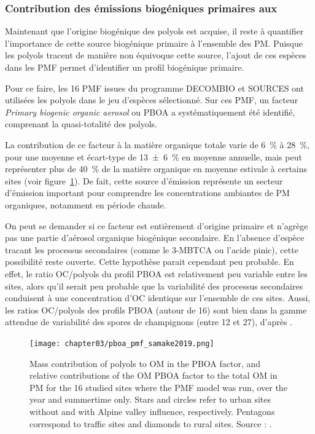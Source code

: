 \subsubsection{Contribution des émissions biogéniques primaires aux \PMdix}%
\label{ssub:contribution_des_émissions_biogéniques_primaires_aux_pmdix}

Maintenant que l'origine biogénique des polyols est acquise, il reste à quantifier
l'importance de cette source biogénique primaire à l'ensemble des PM.
Puisque les polyols tracent de manière non équivoque cette source, l'ajout de ces espèces dans
les PMF permet d'identifier un profil biogénique primaire.

Pour ce faire, les 16 PMF issues du programme DECOMBIO et SOURCES ont utilisées les polyols
dans le jeu d'espèces sélectionné. Sur ces PMF, un facteur \textit{Primary biogenic
organic aerosol} ou PBOA a systématiquement été identifié, comprenant la quasi-totalité
des polyols.

La contribution de ce facteur à la matière organique totale varie de \SI{6}{\percent} à \SI{28}{\percent}, pour une
moyenne et écart-type de \SI{13\pm6}{\percent} en moyenne annuelle, mais peut représenter
plus de \SI{40}{\percent} de la matière organique en moyenne estivale à certains sites (voir
figure~\ref{fig:chapter03/pboa_pmf_samake2019}).
De fait, cette source d'émission représente un secteur d'émission important pour comprendre
les concentrations ambiantes de PM organiques, notamment en période chaude.

On peut se demander si ce facteur est entièrement d'origine primaire et n'agrège pas une
partie d'aérosol organique biogénique secondaire. En l'absence d'espèce tracant les
processus secondaires (comme le 3-MBTCA ou l'acide pinic), cette possibilité reste
ouverte.  Cette hypothèse parait cependant peu probable. En effet, le ratio OC/polyols du
profil PBOA est relativement peu variable entre les sites, alors qu'il serait peu
probable que la variabilité des processus secondaires conduisent à une concentration d'OC
identique sur l'ensemble de ces sites.  Aussi, les ratios OC/polyols des profils PBOA
(autour de 16) sont bien dans la gamme attendue de variabilité des spores de champignons
(entre 12 et 27), d'après \cite{bauerSignificant2008,yttriSource2011}.

\begin{figure}[ht]
    \centering
    \texttt{[image: chapter03/pboa\_pmf\_samake2019.png]}
    \caption{
        Mass contribution of polyols to OM in the PBOA factor, and relative contributions
        of the OM PBOA factor to the total OM in PM for the 16 studied sites where the
        PMF model was run, over the year and summertime only. Stars and circles refer to
        urban sites without and with Alpine valley influence, respectively. Pentagons
        correspond to traffic sites and diamonds to rural sites.
        Source : \cite[figure 9]{samakePolyols2019}.
    }%
    \label{fig:chapter03/pboa_pmf_samake2019}
\end{figure}

